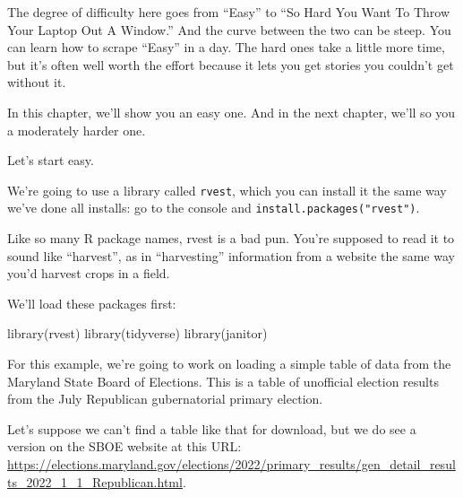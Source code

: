 \documentclass[
  letterpaper,
  DIV=11,
  numbers=noendperiod]{scrreprt}
\newenvironment{Shaded}{\begin{snugshade}}{\end{snugshade}}
\newcommand{\FunctionTok}[1]{\textcolor[rgb]{0.28,0.35,0.67}{#1}}
\newcommand{\NormalTok}[1]{\textcolor[rgb]{0.00,0.23,0.31}{#1}}
\begin{document}
The degree of difficulty here goes from ``Easy'' to ``So Hard You Want
To Throw Your Laptop Out A Window.'' And the curve between the two can
be steep. You can learn how to scrape ``Easy'' in a day. The hard ones
take a little more time, but it's often well worth the effort because it
lets you get stories you couldn't get without it.

In this chapter, we'll show you an easy one. And in the next chapter,
we'll so you a moderately harder one.

Let's start easy.

We're going to use a library called \texttt{rvest}, which you can
install it the same way we've done all installs: go to the console and
\texttt{install.packages("rvest")}.

Like so many R package names, rvest is a bad pun. You're supposed to
read it to sound like ``harvest'', as in ``harvesting'' information from
a website the same way you'd harvest crops in a field.

We'll load these packages first:

\begin{Shaded}
\begin{Highlighting}[]
\FunctionTok{library}\NormalTok{(rvest)}
\FunctionTok{library}\NormalTok{(tidyverse)}
\FunctionTok{library}\NormalTok{(janitor)}
\end{Highlighting}
\end{Shaded}

For this example, we're going to work on loading a simple table of data
from the Maryland State Board of Elections. This is a table of
unofficial election results from the July Republican gubernatorial
primary election.

Let's suppose we can't find a table like that for download, but we do
see a version on the SBOE website at this URL:
\url{https://elections.maryland.gov/elections/2022/primary_results/gen_detail_results_2022_1_1_Republican.html}.
\end{document}
